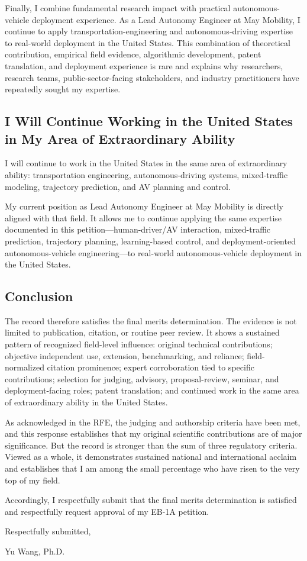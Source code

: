 \documentclass[11pt,letterpaper]{article}
\newcommand{\Beneficiary}{Yu Wang, Ph.D.}
\begin{document}
Finally, I combine fundamental research impact with practical autonomous-vehicle deployment experience. As a Lead Autonomy Engineer at May Mobility, I continue to apply transportation-engineering and autonomous-driving expertise to real-world deployment in the United States. This combination of theoretical contribution, empirical field evidence, algorithmic development, patent translation, and deployment experience is rare and explains why researchers, research teams, public-sector-facing stakeholders, and industry practitioners have repeatedly sought my expertise.

\subsection{I Will Continue Working in the United States in My Area of Extraordinary Ability}

I will continue to work in the United States in the same area of extraordinary ability: transportation engineering, autonomous-driving systems, mixed-traffic modeling, trajectory prediction, and AV planning and control.

My current position as Lead Autonomy Engineer at May Mobility is directly aligned with that field. It allows me to continue applying the same expertise documented in this petition---human-driver/AV interaction, mixed-traffic prediction, trajectory planning, learning-based control, and deployment-oriented autonomous-vehicle engineering---to real-world autonomous-vehicle deployment in the United States.

\subsection{Conclusion}

The record therefore satisfies the final merits determination. The evidence is not limited to publication, citation, or routine peer review. It shows a sustained pattern of recognized field-level influence: original technical contributions; objective independent use, extension, benchmarking, and reliance; field-normalized citation prominence; expert corroboration tied to specific contributions; selection for judging, advisory, proposal-review, seminar, and deployment-facing roles; patent translation; and continued work in the same area of extraordinary ability in the United States.

As acknowledged in the RFE, the judging and authorship criteria have been met, and this response establishes that my original scientific contributions are of major significance. But the record is stronger than the sum of three regulatory criteria. Viewed as a whole, it demonstrates sustained national and international acclaim and establishes that I am among the small percentage who have risen to the very top of my field.

Accordingly, I respectfully submit that the final merits determination is satisfied and respectfully request approval of my EB-1A petition.

\vspace{2em}
Respectfully submitted,

\vspace{3em}
\Beneficiary
\end{document}

